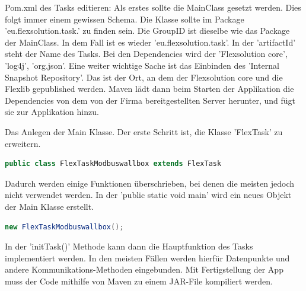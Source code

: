 \begin{compactenum}

    \item Pom.xml des Tasks editieren: Als erstes sollte die MainClass gesetzt werden. Dies folgt immer einem gewissen Schema. Die Klasse sollte im Package 'eu.flexsolution.task.' zu finden sein. Die GroupID ist dieselbe wie das Package der MainClass. In dem Fall ist es wieder 'eu.flexsolution.task'.  In der 'artifactId' steht der Name des Tasks. Bei den Dependencies wird der 'Flexsolution core', 'log4j', 'org.json'. Eine weiter wichtige Sache ist das Einbinden des 'Internal Snapshot Repository'. Das ist der Ort, an dem der Flexsolution core und die Flexlib gepublished werden. Maven lädt dann beim Starten der Applikation die Dependencies von dem von der Firma bereitgestellten Server herunter, und fügt sie zur Applikation hinzu.
    \item Das Anlegen der Main Klasse. Der erste Schritt ist, die Klasse 'FlexTask' zu erweitern.
    \begin{lstlisting}[language=java,caption=Erweiterung einer Java-Klasse mit einem 'Flextask',label=lst:impl:foo]
        public class FlexTaskModbuswallbox extends FlexTask 
    \end{lstlisting}
    Dadurch werden einige Funktionen überschrieben, bei denen die meisten jedoch nicht verwendet werden. In der 'public static void main' wird ein neues Objekt der Main Klasse erstellt.
    \begin{lstlisting}[language=java,caption=Aufruf eines neuen Objektes der Klasse FlexTaskModbusWallbox,label=lst:impl:foo]
        new FlexTaskModbuswallbox();  
    \end{lstlisting}
    In der 'initTask(){}' Methode kann dann die Hauptfunktion des Tasks implementiert werden. In den meisten Fällen werden hierfür Datenpunkte und andere Kommunikations-Methoden eingebunden. Mit Fertigstellung der App muss der Code mithilfe von Maven zu einem JAR-File kompiliert werden.


\end{compactenum}
